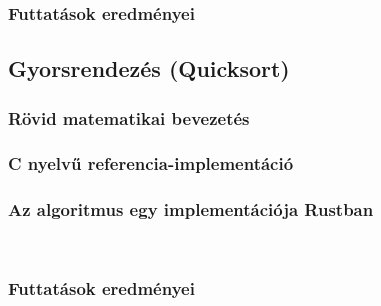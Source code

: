 \subsubsection{Futtatások eredményei} %

\subsection{Gyorsrendezés (Quicksort)}
\subsubsection{Rövid matematikai bevezetés}
\subsubsection{C nyelvű referencia-implementáció}
\subsubsection{Az algoritmus egy implementációja Rustban}
\begin{lstlisting}
  
\end{lstlisting}
\subsubsection{Futtatások eredményei} %
